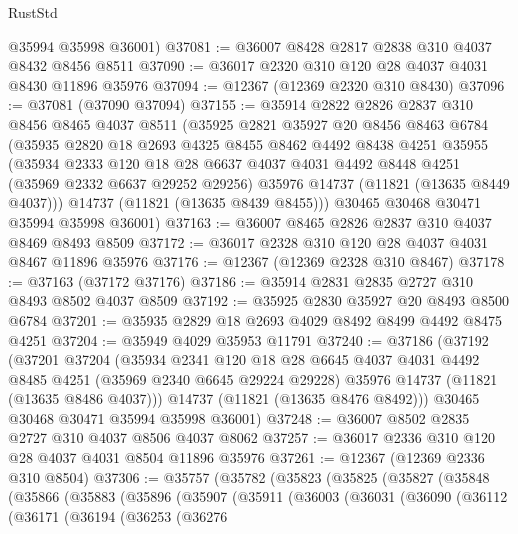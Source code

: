 \begin{lexlean}{RustStd}
\begin{coremodule}
      @35994
      @35998
      @36001)
@37081 := @36007 @8428 @2817 @2838 @310 @4037 @8432 @8456 @8511
@37090 := @36017 @2320 @310 @120 @28 @4037 @4031 @8430 @11896 @35976
@37094 := @12367 (@12369 @2320 @310 @8430)
@37096 := @37081 (@37090 @37094)
@37155 := @35914
    @2822
    @2826
    @2837
    @310
    @8456
    @8465
    @4037
    @8511
    (@35925
      @2821
      @35927
      @20
      @8456
      @8463
      @6784
      (@35935
        @2820
        @18
        @2693
        @4325
        @8455
        @8462
        @4492
        @8438
        @4251
        @35955
        (@35934
          @2333
          @120
          @18
          @28
          @6637
          @4037
          @4031
          @4492
          @8448
          @4251
          (@35969 @2332 @6637 @29252 @29256)
          @35976
          @14737
          (@11821 (@13635 @8449 @4037)))
        @14737
        (@11821 (@13635 @8439 @8455)))
      @30465
      @30468
      @30471
      @35994
      @35998
      @36001)
@37163 := @36007 @8465 @2826 @2837 @310 @4037 @8469 @8493 @8509
@37172 := @36017 @2328 @310 @120 @28 @4037 @4031 @8467 @11896 @35976
@37176 := @12367 (@12369 @2328 @310 @8467)
@37178 := @37163 (@37172 @37176)
@37186 := @35914 @2831 @2835 @2727 @310 @8493 @8502 @4037 @8509
@37192 := @35925 @2830 @35927 @20 @8493 @8500 @6784
@37201 := @35935 @2829 @18 @2693 @4029 @8492 @8499 @4492 @8475 @4251
@37204 := @35949 @4029 @35953 @11791
@37240 := @37186
    (@37192
      (@37201
        @37204
        (@35934
          @2341
          @120
          @18
          @28
          @6645
          @4037
          @4031
          @4492
          @8485
          @4251
          (@35969 @2340 @6645 @29224 @29228)
          @35976
          @14737
          (@11821 (@13635 @8486 @4037)))
        @14737
        (@11821 (@13635 @8476 @8492)))
      @30465
      @30468
      @30471
      @35994
      @35998
      @36001)
@37248 := @36007 @8502 @2835 @2727 @310 @4037 @8506 @4037 @8062
@37257 := @36017 @2336 @310 @120 @28 @4037 @4031 @8504 @11896 @35976
@37261 := @12367 (@12369 @2336 @310 @8504)
@37306 := @35757
    (@35782
      (@35823
        (@35825
          (@35827
            (@35848
              (@35866
                (@35883
                  (@35896
                    (@35907
                      (@35911
                        (@36003
                          (@36031
                            (@36090
                              (@36112
                                (@36171
                                  (@36194
                                    (@36253
                                      (@36276

\end{coremodule}
\end{lexlean}
